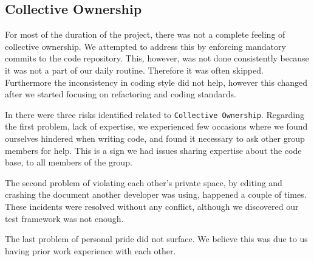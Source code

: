 \subsection{Collective Ownership}
For most of the duration of the project, there was not a complete feeling of collective ownership. We attempted to address this by enforcing mandatory commits to the code repository. This, however, was not done consistently because it was not a part of our daily routine. Therefore it was often skipped. Furthermore the inconsistency in coding style did not help, however this changed after we started focusing on refactoring and coding standards.

In  there were three risks identified related to \texttt{Collective Ownership}. Regarding the first problem, lack of expertise, we experienced few occasions where we found ourselves hindered when writing code, and found it necessary to ask other group members for help. This is a sign we had issues sharing expertise about the code base, to all members of the group.

The second problem of violating each other's private space, by editing and crashing the document another developer was using, happened a couple of times.
These incidents were resolved without any conflict, although we discovered our test framework was not enough.

The last problem of personal pride did not surface.
We believe this was due to us having prior work experience with each other.